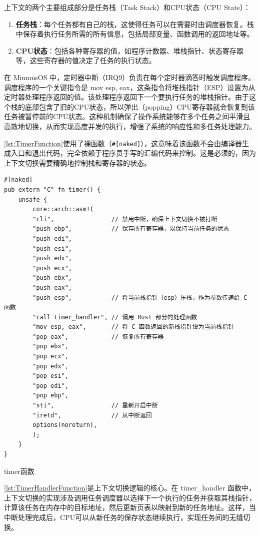 上下文的两个主要组成部分是任务栈（Task Stack）和CPU状态（CPU State）：

\begin{enumerate}
    \item \textbf{任务栈}：每个任务都有自己的栈，这使得任务可以在需要时由调度器恢复。栈中保存着执行任务所需的所有信息，包括局部变量、函数调用的返回地址等。
    \item \textbf{CPU状态}：包括各种寄存器的值，如程序计数器、堆栈指针、状态寄存器等，这些寄存器的值决定了任务的执行状态。
\end{enumerate}

在 MinmusOS 中，定时器中断（IRQ9）负责在每个定时器滴答时触发调度程序。调度程序的一个关键指令是 mov esp, eax，这条指令将堆栈指针（ESP）设置为从定时器处理程序返回的值。该处理程序返回下一个要执行任务的堆栈指针。由于这个栈的底部包含了旧的CPU状态，所以弹出（popping）CPU寄存器就会恢复到该任务被暂停前的CPU状态。这种机制确保了操作系统能够在多个任务之间平滑且高效地切换，从而实现高度并发的执行，增强了系统的响应性和多任务处理能力。

\cref{lst:TimerFunction}使用了裸函数（\texttt{\#[naked]}），这意味着该函数不会由编译器生成入口和退出代码，完全依赖于程序员手写的汇编代码来控制。这是必须的，因为上下文切换需要精确地控制栈和寄存器的状态。

\begin{listing}[htbp]
    \begin{verbatim}
#[naked]
pub extern "C" fn timer() {
    unsafe {
        core::arch::asm!(
        "cli",                // 禁用中断，确保上下文切换不被打断
        "push ebp",           // 保存所有寄存器，以保持当前任务的状态
        "push edi",
        "push esi",
        "push edx",
        "push ecx",
        "push ebx",
        "push eax",
        "push esp",           // 将当前栈指针（esp）压栈，作为参数传递给 C 函数
        "call timer_handler", // 调用 Rust 部分的处理函数
        "mov esp, eax",       // 将 C 函数返回的新栈指针设为当前栈指针
        "pop eax",            // 恢复所有寄存器
        "pop ebx",
        "pop ecx",
        "pop edx",
        "pop esi",
        "pop edi",
        "pop ebp",
        "sti",                // 重新开启中断
        "iretd",              // 从中断返回
        options(noreturn),
        );
    }
}
    \end{verbatim}
    \caption{timer函数}\label{lst:TimerFunction}
\end{listing}

\cref{lst:TimerHandlerFunction}是上下文切换逻辑的核心。在 timer\_handler 函数中，上下文切换的实现涉及调用任务调度器以选择下一个执行的任务并获取其栈指针，计算该任务在内存中的目标地址，然后更新页表以映射到新的任务地址。这样，当中断处理完成后，CPU可以从新任务的保存状态继续执行，实现任务间的无缝切换。

